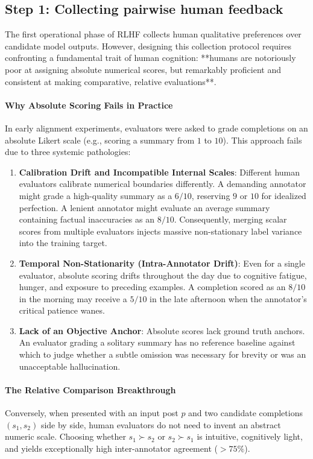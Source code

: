 \documentclass[../../../main.tex]{subfiles}
\begin{document}
\subsection{Step 1: Collecting pairwise human feedback}
\label{subsec:step1_collecting_human_feedback}

The first operational phase of RLHF collects human qualitative preferences over candidate model outputs. However, designing this collection protocol requires confronting a fundamental trait of human cognition: **humans are notoriously poor at assigning absolute numerical scores, but remarkably proficient and consistent at making comparative, relative evaluations**.

\paragraph{Why Absolute Scoring Fails in Practice}
In early alignment experiments, evaluators were asked to grade completions on an absolute Likert scale (e.g., scoring a summary from $1$ to $10$). This approach fails due to three systemic pathologies:
\begin{enumerate}
    \item \textbf{Calibration Drift and Incompatible Internal Scales}: Different human evaluators calibrate numerical boundaries differently. A demanding annotator might grade a high-quality summary as a $6/10$, reserving $9$ or $10$ for idealized perfection. A lenient annotator might evaluate an average summary containing factual inaccuracies as an $8/10$. Consequently, merging scalar scores from multiple evaluators injects massive non-stationary label variance into the training target.
    \item \textbf{Temporal Non-Stationarity (Intra-Annotator Drift)}: Even for a single evaluator, absolute scoring drifts throughout the day due to cognitive fatigue, hunger, and exposure to preceding examples. A completion scored as an $8/10$ in the morning may receive a $5/10$ in the late afternoon when the annotator's critical patience wanes.
    \item \textbf{Lack of an Objective Anchor}: Absolute scores lack ground truth anchors. An evaluator grading a solitary summary has no reference baseline against which to judge whether a subtle omission was necessary for brevity or was an unacceptable hallucination.
\end{enumerate}

\paragraph{The Relative Comparison Breakthrough}
Conversely, when presented with an input post $p$ and two candidate completions $(s_1, s_2)$ side by side, human evaluators do not need to invent an abstract numeric scale. Choosing whether $s_1 \succ s_2$ or $s_2 \succ s_1$ is intuitive, cognitively light, and yields exceptionally high inter-annotator agreement ($>75\%$).
\end{document}
